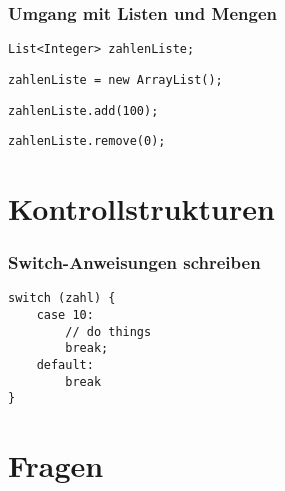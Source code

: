 \documentclass[mathserif]{beamer}
\begin{document}
\begin{frame}[fragile]
\frametitle{Umgang mit Listen und Mengen}
\pause
    \begin{lstlisting}
List<Integer> zahlenListe;
    \end{lstlisting}
\pause
    \begin{lstlisting}
zahlenListe = new ArrayList();
    \end{lstlisting}
\pause
    \begin{lstlisting}
zahlenListe.add(100);
    \end{lstlisting}
\pause
    \begin{lstlisting}
zahlenListe.remove(0);
    \end{lstlisting}
\end{frame}

\section{Kontrollstrukturen}

\begin{frame}[fragile]
\frametitle{Switch-Anweisungen schreiben}
\pause
    \begin{lstlisting}
switch (zahl) {
    case 10:
        // do things
        break;
    default:
        break
}

    \end{lstlisting}
\end{frame}

\section{Fragen}
\begin{frame}
    \pause
\end{frame}
\end{document}
